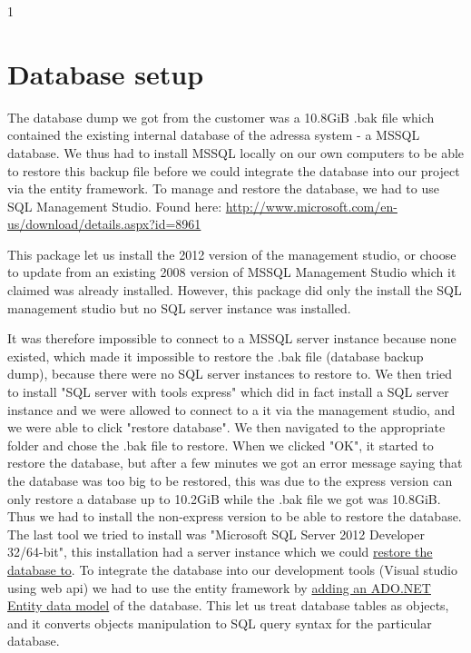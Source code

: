 1\section{Database setup}
The database dump we got from the customer was a 10.8GiB .bak file which contained the existing internal database of the adressa system - a MSSQL database.
We thus had to install MSSQL locally on our own computers to be able to restore this backup file before we could integrate the database into our project via the entity framework. To manage and restore the database, we had to use SQL Management Studio. Found here: \href{http://www.microsoft.com/en-us/download/details.aspx?id=8961}{http://www.microsoft.com/en-us/download/details.aspx?id=8961}

This package let us install the 2012 version of the management studio, or choose to update from an existing 2008 version of MSSQL Management Studio which it claimed was already installed. However, this package did only the install the SQL management studio but no SQL server instance was installed.

It was therefore impossible to connect to a MSSQL server instance because none existed, which made it impossible to restore the .bak file (database backup dump), because there were no SQL server instances to restore to.
We then tried to install "SQL server with tools express" which did in fact install a SQL server instance and we were allowed to connect to a it via the management studio, and we were able to click "restore database". We then navigated to the appropriate folder and chose the .bak file to restore. When we clicked "OK", it started to restore the database, but after a few minutes we got an error message saying that the database was too big to be restored, this was due to the express version can only restore a database up to 10.2GiB while the .bak file we got was 10.8GiB. Thus we had to install the non-express version to be able to restore the database. The last tool we tried to install was "Microsoft SQL Server 2012 Developer 32/64-bit", this installation had a server instance which we could \href{http://www.katieandemil.com/sql-server-2012-restore-database-backup-file}{restore the database to}.
To integrate the database into our development tools (Visual studio using web api) we had to use the entity framework by \href{http://www.entityframeworktutorial.net/EntityFramework5/entity-framework5-introduction.aspx}{adding an ADO.NET Entity data model} of the database.
This let us treat database tables as objects, and it converts objects manipulation to SQL query syntax for the particular database.